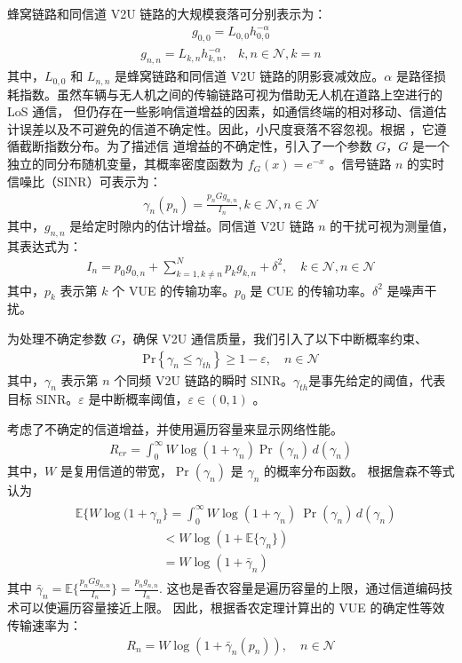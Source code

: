 蜂窝链路和同信道 V2U 链路的大规模衰落可分别表示为：
\begin{eqnarray}\label{E2-3}
g_{0,0}=L_{0,0}h_{0,0}^{-\alpha}
\end{eqnarray}
\begin{eqnarray}\label{E2-4}
g_{n,n}=L_{k,n}h_{k,n}^{-\alpha},          &k, n\in \mathcal{N}, k=n
\end{eqnarray}
其中，$L_{0,0}$ 和 $L_{n,n}$ 是蜂窝链路和同信道 V2U 链路的阴影衰减效应。$\alpha$ 是路径损耗指数。虽然车辆与无人机之间的传输链路可视为借助无人机在道路上空进行的 LoS 通信，
但仍存在一些影响信道增益的因素，如通信终端的相对移动、信道估计误差以及不可避免的信道不确定性。因此，小尺度衰落不容忽视。根据 \cite{CCO}，它遵循截断指数分布。为了描述信
道增益的不确定性，引入了一个参数 $G$，$G$ 是一个独立的同分布随机变量，其概率密度函数为 $f_G (x)=e^{-x}$ 。信号链路 $n$ 的实时信噪比（SINR）可表示为：
\begin{eqnarray}\label{E2-5}
\gamma_{n}(p_n)=\frac{p_{n}G g_{n,n}}{I_n}, k\in\mathcal{N},n\in\mathcal{N}
\end{eqnarray}
其中，$g_{n,n}$ 是给定时隙内的估计增益。同信道 V2U 链路 $n$ 的干扰可视为测量值，其表达式为：
\begin{eqnarray}\label{E2-6}
I_n=p_0 g_{0,n}+\!\!\!\sum\limits_{k=1,k\neq n}^N\!\!\!\! p_k g_{k,n}+\delta^2, \quad k\in\mathcal{N},n\in\mathcal{N}
\end{eqnarray}
其中，$p_k$ 表示第 $k$ 个 VUE 的传输功率。$p_0$ 是 CUE 的传输功率。$\delta^2$ 是噪声干扰。

为处理不确定参数 $G$，确保 V2U 通信质量，我们引入了以下中断概率约束、
\begin{eqnarray}\label{E2-7}
\textrm{Pr}\left\{\gamma_{n} \leq \gamma_{th}\right\}\geq1-\varepsilon,\quad  n\in\mathcal{N}
\end{eqnarray}
其中，$\gamma_{n}$ 表示第 $n$ 个同频 V2U 链路的瞬时 SINR。$\gamma_{th}$是事先给定的阈值，代表目标 SINR。$\varepsilon$ 是中断概率阈值，$\varepsilon \in (0,1)$ 。

考虑了不确定的信道增益，并使用遍历容量来显示网络性能。
\begin{eqnarray}\label{E2-8}
R_{er}=\int_{0}^{\infty} W \log(1+\gamma_{n})\Pr(\gamma_{n})\, d(\gamma_{n})
\end{eqnarray}
其中，$W$ 是复用信道的带宽，$\Pr(\gamma_{n})$ 是 $\gamma_{n}$ 的概率分布函数。
根据詹森不等式认为
\begin{eqnarray}\label{E2-9}
 \begin{array}{lll}
&\!\!\!\!\!\!\mathbb{E}\{W \log(1+\gamma_{n}\}=\int_{0}^{\infty} W \log(1+\gamma_{n})\ \Pr(\gamma_{n})\, d(\gamma_{n})\\
&\quad\quad\quad\quad\quad\quad\quad\!\!<W\log(1+\mathbb{E}\{\gamma_{n}\})\\
&\quad\quad\quad\quad\quad\quad\quad\!\!=W\log(1+\bar{\gamma}_{n})
 \end{array}
\end{eqnarray}
其中 $\bar{\gamma}_{n}\!=\mathbb{E}\{\!\frac{p_{n}G g_{n,n}}{I_n}\}
\!=\!\frac{p_{n}g_{n,n}}{I_n}$. 这也是香农容量是遍历容量的上限，通过信道编码技术可以使遍历容量接近上限。
因此，根据香农定理计算出的 VUE 的确定性等效传输速率为：
\begin{eqnarray}\label{E2-10}
R_{n}=W\log(1+\bar{\gamma}_{n}(p_n)),\quad  n\in\mathcal{N}
\end{eqnarray}
